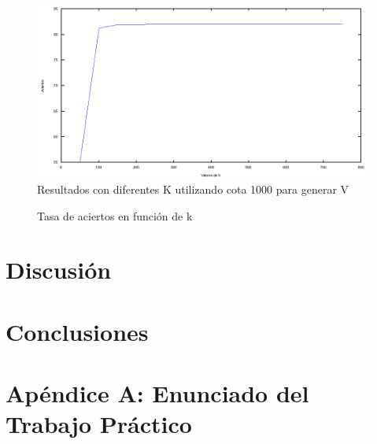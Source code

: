 \documentclass[a4paper,10pt,twoside]{article}
\begin{document}
\begin{figure}[H]
  \centering
  \includegraphics[width=15cm]{aciertosVsK.png}
  \caption{Resultados con diferentes K utilizando cota 1000 para generar V}
\end{figure}

\begin{figure}[H]
  \centering
  
  \caption{Tasa de aciertos en función de k}
\end{figure}




\section{Discusión}




\section{Conclusiones}




\newpage

\section{Apéndice A: Enunciado del Trabajo Práctico}
\end{document}
